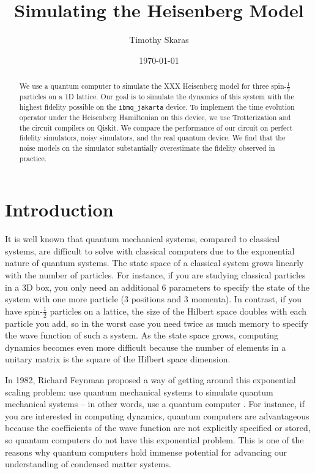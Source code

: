 \documentclass[aps,prl, reprint]{revtex4-2}
\begin{document}
\title{Simulating the Heisenberg Model}
\date{\today}
\author{Timothy Skaras}
\begin{abstract}
We use a quantum computer to simulate the XXX Heisenberg model for three spin-$\frac{1}{2}$ particles on a 1D lattice. Our goal is to simulate the dynamics of this system with the highest fidelity possible on the \texttt{ibmq\_jakarta} device. To implement the time evolution operator under the Heisenberg Hamiltonian on this device, we use Trotterization and the circuit compilers on Qiskit. We compare the performance of our circuit on perfect fidelity simulators, noisy simulators, and the real quantum device. We find that the noise models on the simulator substantially overestimate the fidelity observed in practice.
\end{abstract}

\maketitle

\section{Introduction}

It is well known that quantum mechanical systems, compared to classical systems, are difficult to solve with classical computers due to the exponential nature of quantum systems. The state space of a classical system grows linearly with the number of particles. For instance, if you are studying classical particles in a 3D box, you only need an additional 6 parameters to specify the state of the system with one more particle (3 positions and 3 momenta). In contrast, if you have spin-$\frac{1}{2}$ particles on a lattice, the size of the Hilbert space doubles with each particle you add, so in the worst case you need twice as much memory to specify the wave function of such a system.  As the state space grows, computing dynamics becomes even more difficult because the number of elements in a unitary matrix is the square of the Hilbert space dimension.

In 1982, Richard Feynman proposed a way of getting around this exponential scaling problem: use quantum mechanical systems to simulate quantum mechanical systems -- in other words, use a quantum computer \cite{feynman1982simulating}. For instance, if you are interested in computing dynamics, quantum computers are advantageous because the coefficients of the wave function are not explicitly specified or stored, so quantum computers do not have this exponential problem. This is one of the reasons why quantum computers hold immense potential for advancing our understanding of condensed matter systems.
\end{document}
